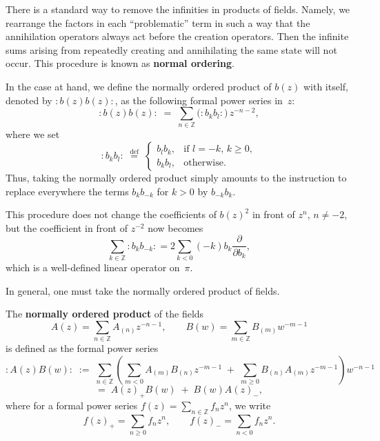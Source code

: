 \documentclass[12pt]{article}
\begin{document}
There is a standard way to remove the infinities in products of fields.
Namely, we rearrange the factors in each ``problematic'' term in such a way that the annihilation operators always act before the creation operators.
Then the infinite sums arising from repeatedly creating and annihilating the same state will not occur.
This procedure is known as \textbf{normal ordering}.

\medskip

In the case at hand, we define the normally ordered product of $b(z)$ with itself, denoted by $:b(z)b(z):$, as the following formal power series in~$z$:
\[
    :b(z)b(z):
    \;=\;
    \sum_{n\in\mathbb{Z}} \big(:b_k b_l:\big)\,z^{-n-2},
\]
where we set
\[
    :b_k b_l:
    \;\stackrel{\mathrm{def}}{=}\;
    \begin{cases}
        b_l b_k, & \text{if } l=-k,\, k\ge0, \\[4pt]
        b_k b_l, & \text{otherwise.}
    \end{cases}
\]
Thus, taking the normally ordered product simply amounts to the instruction to replace everywhere the terms $b_k b_{-k}$ for $k>0$ by $b_{-k} b_k$.

\medskip

This procedure does not change the coefficients of $b(z)^2$ in front of $z^n$, $n\ne -2$, but the coefficient in front of $z^{-2}$ now becomes
\[
    \sum_{k\in\mathbb{Z}} :b_k b_{-k}:
    = 2\sum_{k<0} (-k)b_k \frac{\partial}{\partial b_k},
\]
which is a well-defined linear operator on~$\pi$.

\medskip

In general, one must take the normally ordered product of fields.
\begin{definition}
    The \textbf{normally ordered product} of the fields
    \[
        A(z) = \sum_{n\in\mathbb{Z}} A_{(n)} z^{-n-1},
        \qquad
        B(w) = \sum_{m\in\mathbb{Z}} B_{(m)} w^{-m-1}
    \]
    is defined as the formal power series
    \[
        :A(z)B(w):
        \;:=\;
        \sum_{n\in\mathbb{Z}}
        \left(
        \sum_{m<0} A_{(m)}B_{(n)}z^{-m-1}
        \;+\;
        \sum_{m\ge0} B_{(n)}A_{(m)}z^{-m-1}
        \right)
        w^{-n-1}
    \]
    \[
        =\;
        A(z)_+ B(w) \;+\; B(w)A(z)_-,
    \]
    where for a formal power series $f(z) = \sum_{n\in\mathbb{Z}} f_n z^n$, we write
    \[
        f(z)_+ = \sum_{n\ge0} f_n z^n,
        \qquad
        f(z)_- = \sum_{n<0} f_n z^n.
    \]
\end{definition}
\end{document}
